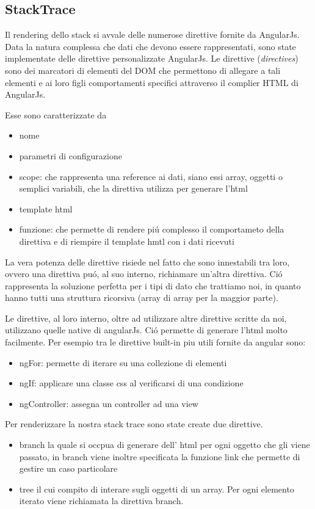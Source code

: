 \subsection{StackTrace}
	Il rendering dello stack si avvale delle numerose direttive fornite da
AngularJs. \\Data la natura complessa che dati che devono essere rappresentati, sono state
implementate delle direttive personalizzate AngularJs.
Le direttive (\emph{directives}) sono dei marcatori di elementi del DOM che permettono di allegare
a tali elementi e ai loro figli comportamenti specifici attraverso il complier
HTML di AngularJs.

Esse sono  caratterizzate da
	\begin{itemize}
		\item nome
		\item parametri di configurazione
		\item scope:  che rappresenta una reference ai dati, siano essi array, oggetti o
				semplici variabili, che la direttiva utilizza per generare l'html
		\item template html
		\item funzione: che permette di rendere piú complesso il comportameto della direttiva
					e di riempire il template hmtl con i dati ricevuti
	\end{itemize}

La vera potenza delle direttive risiede nel fatto che sono innestabili tra loro,
ovvero una direttiva puó, al suo interno, richiamare un'altra direttiva. Ció
rappresenta la soluzione perfetta per i tipi di dato che trattiamo noi, in quanto
hanno tutti una struttura ricorsiva (array di array per la maggior parte).

Le direttive, al loro interno, oltre ad utilizzare altre direttive scritte da noi,
utilizzano quelle native di angularJs. Ció permette di generare l'html molto
facilmente. Per esempio tra le direttive built-in piu utili fornite da angular sono:
\begin{itemize}
	\item ngFor: permette di iterare su una collezione di elementi
	\item ngIf: applicare una classe css al verificarsi di una condizione
	\item ngController: assegna un controller ad una view
\end{itemize}

Per renderizzare la nostra stack trace sono state create due direttive.
\begin{itemize}
	\item branch la quale si occpua di generare dell' html per ogni oggetto che gli viene passato,
  		in branch viene inoltre specificata la funzione link che permette di gestire un caso particolare
 	\item tree il cui compito di interare sugli oggetti di un array. Per ogni elemento iterato viene richiamata
  		la direttiva branch.
\end{itemize}

